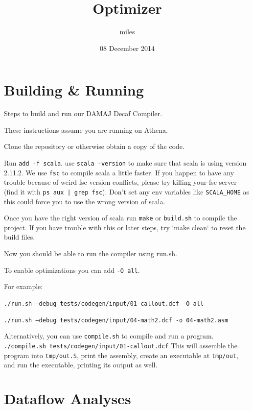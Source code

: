 \documentclass[11pt]{article}
\title{Optimizer}
\author{miles}
\date{08 December 2014}
\begin{document}
\maketitle

\setcounter{tocdepth}{3}
\tableofcontents
\vspace*{1cm}
\section{Building \& Running}
\label{sec-1}

  Steps to build and run our DAMAJ Decaf Compiler.
  
  These instructions assume you are running on Athena.
  
  Clone the repository or otherwise obtain a copy of the code.

  Run \texttt{add -f scala}. use \texttt{scala -version} to make sure that scala is using version 2.11.2.
  We use \texttt{fsc} to compile scala a little faster. If you happen to have any trouble because of weird
  fsc version conflicts, please try killing your fsc server (find it with \texttt{ps aux | grep fsc}).
  Don't set any env variables like \texttt{SCALA\_HOME} as this could force you to use the wrong version
  of scala.
  
  Once you have the right version of scala run \texttt{make} or \texttt{build.sh} to compile the project.
  If you have trouble with this or later steps, try `make clean` to reset the build files.
  
  Now you should be able to run the compiler using run.sh.

  To enable optimizations you can add \texttt{-O all}.

  For example:

  \texttt{./run.sh --debug tests/codegen/input/01-callout.dcf -O all}

  \texttt{./run.sh --debug tests/codegen/input/04-math2.dcf -o 04-math2.asm}

  Alternatively, you can use \texttt{compile.sh} to compile and run a program.
  \texttt{./compile.sh tests/codegen/input/01-callout.dcf}
  This will assemble the program into \texttt{tmp/out.S}, print the assembly, create an executable at \texttt{tmp/out},
  and run the executable, printing its output as well.

\section{Dataflow Analyses}
\label{sec-2}
\end{document}
